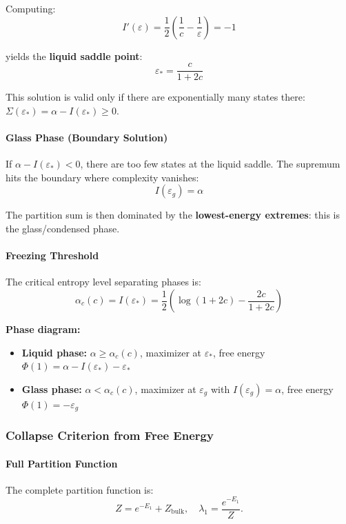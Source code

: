 \documentclass[11pt]{article}
\begin{document}
Computing:
\begin{equation}
I'(\varepsilon) = \frac{1}{2}\left(\frac{1}{c} - \frac{1}{\varepsilon}\right) = -1
\end{equation}

yields the \textbf{liquid saddle point}:
\begin{equation}
\boxed{\varepsilon_* = \frac{c}{1 + 2c}}
\end{equation}

This solution is valid only if there are exponentially many states there: $\Sigma(\varepsilon_*) = \alpha - I(\varepsilon_*) \geq 0$.

\paragraph{Glass Phase (Boundary Solution)}
If $\alpha - I(\varepsilon_*) < 0$, there are too few states at the liquid saddle. The supremum hits the boundary where complexity vanishes:
\begin{equation}
I(\varepsilon_g) = \alpha
\end{equation}

The partition sum is then dominated by the \textbf{lowest-energy extremes}: this is the glass/condensed phase.

\paragraph{Freezing Threshold}
The critical entropy level separating phases is:
\begin{equation}
\boxed{\alpha_c(c) = I(\varepsilon_*) = \frac{1}{2}\left(\log(1 + 2c) - \frac{2c}{1 + 2c}\right)}
\end{equation}

\textbf{Phase diagram:}
\begin{itemize}
\item \textbf{Liquid phase:} $\alpha \geq \alpha_c(c)$, maximizer at $\varepsilon_*$, free energy $\Phi(1) = \alpha - I(\varepsilon_*) - \varepsilon_*$
\item \textbf{Glass phase:} $\alpha < \alpha_c(c)$, maximizer at $\varepsilon_g$ with $I(\varepsilon_g) = \alpha$, free energy $\Phi(1) = -\varepsilon_g$
\end{itemize}

\subsubsection{Collapse Criterion from Free Energy}
\paragraph{Full Partition Function}
The complete partition function is:
\begin{equation}
Z = e^{-E_1} + Z_{\text{bulk}}, \quad \lambda_1 = \frac{e^{-E_1}}{Z}.
\end{equation}
\end{document}

